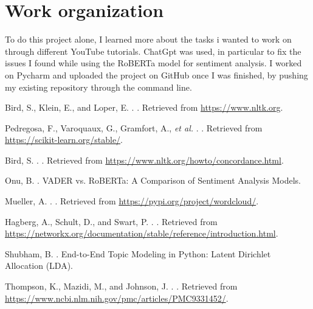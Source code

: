 \documentclass[11pt]{article}
\begin{document}
\section{Work organization}
To do this project alone, I learned more about the tasks i wanted to work on through different YouTube tutorials. ChatGpt was used, in particular to fix the issues I found while using the RoBERTa model for sentiment analysis. I worked on Pycharm and uploaded the project on GitHub once I was finished, by pushing my existing repository through the command line.

\begin{thebibliography}{}

Bird, S., Klein, E., and Loper, E.
.
.
\newblock Retrieved from \url{https://www.nltk.org}.

Pedregosa, F., Varoquaux, G., Gramfort, A., \textit{et al.}
.
.
\newblock Retrieved from \url{https://scikit-learn.org/stable/}.

Bird, S.
.
.
\newblock Retrieved from \url{https://www.nltk.org/howto/concordance.html}.

Onu, B.
.
\newblock VADER vs. RoBERTa: A Comparison of Sentiment Analysis Models.

Mueller, A.
.
.
\newblock Retrieved from \url{https://pypi.org/project/wordcloud/}.

Hagberg, A., Schult, D., and Swart, P.
.
.
\newblock Retrieved from \url{https://networkx.org/documentation/stable/reference/introduction.html}.

Shubham, B.
.
\newblock End-to-End Topic Modeling in Python: Latent Dirichlet Allocation (LDA).

Thompson, K., Mazidi, M., and Johnson, J.
.
.
\newblock Retrieved from \url{https://www.ncbi.nlm.nih.gov/pmc/articles/PMC9331452/}.


\end{thebibliography}
\end{document}
